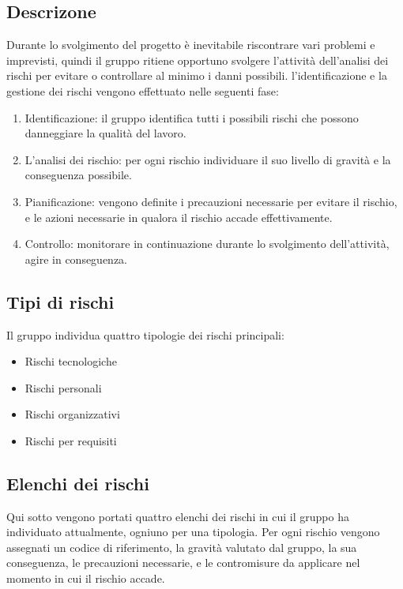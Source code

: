 \subsection{Descrizone}
Durante lo svolgimento del progetto è inevitabile riscontrare vari problemi e imprevisti, quindi il gruppo ritiene opportuno svolgere l’attività dell’analisi dei rischi per evitare o controllare al minimo i danni possibili.\newline
l’identificazione e la gestione dei rischi vengono effettuato nelle seguenti fase:
\begin{enumerate}
\item Identificazione:  il gruppo identifica tutti i possibili rischi che possono danneggiare la qualità del lavoro.
\item L’analisi dei rischio: per ogni rischio individuare il suo livello di gravità e la conseguenza possibile.
\item Pianificazione: vengono definite i precauzioni necessarie per evitare il rischio, e le azioni necessarie in qualora il rischio accade effettivamente.
\item Controllo: monitorare in continuazione durante lo svolgimento dell’attività, agire in conseguenza.
\end{enumerate}

\subsection{Tipi di rischi}
Il gruppo individua quattro tipologie dei rischi principali:
\begin{itemize}
\item Rischi tecnologiche
\item Rischi personali 
\item Rischi organizzativi
\item Rischi per requisiti
\end{itemize}

\subsection{Elenchi dei rischi}
Qui sotto vengono portati quattro elenchi dei rischi in cui il gruppo ha individuato attualmente, ogniuno per una tipologia.
Per ogni rischio vengono assegnati un codice di riferimento, la gravità valutato dal gruppo, la sua conseguenza, le precauzioni necessarie, e le contromisure da applicare nel momento in cui il rischio accade. 
